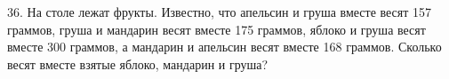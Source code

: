 36. На столе лежат фрукты. Известно, что апельсин и груша вместе весят 157 граммов, груша и мандарин весят вместе 175 граммов, яблоко и груша весят вместе 300 граммов, а мандарин и апельсин весят вместе 168 граммов. Сколько весят вместе взятые яблоко, мандарин и груша?\\
